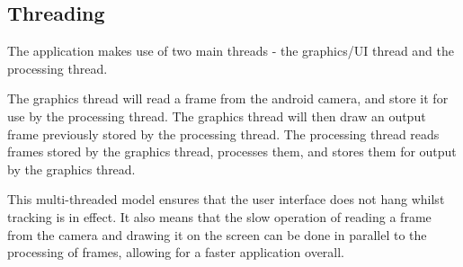 \subsection{Threading}

The application makes use of two main threads - the graphics/UI thread and the processing thread.

The graphics thread will read a frame from the android camera, and store it for use by the processing thread. The graphics thread will then draw an output frame previously stored by the processing thread. The processing thread reads frames stored by the graphics thread, processes them, and stores them for output by the graphics thread.

This multi-threaded model ensures that the user interface does not hang whilst tracking is in effect. It also means that the slow operation of reading a frame from the camera and drawing it on the screen can be done in parallel to the processing of frames, allowing for a faster application overall.